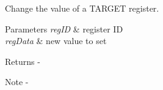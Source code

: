 Change the value of a T\+A\+R\+G\+ET register. 


\begin{DoxyParams}{Parameters}
{\em reg\+ID} & register ID \\
\hline
{\em reg\+Data} & new value to set\\
\hline
\end{DoxyParams}
\begin{DoxyReturn}{Returns}
-\/
\end{DoxyReturn}
\begin{DoxyNote}{Note}
-\/ 
\end{DoxyNote}
